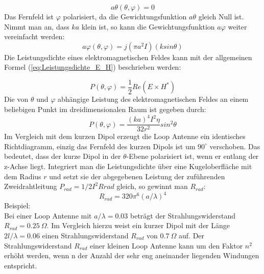 \begin{equation}\label{GewichtungsfunktionLoop_aTheta}
a\theta(\theta, \varphi) =0
\end{equation}
Das Fernfeld ist $\varphi$ polarisiert, da die Gewichtungsfunktion $a\theta$ gleich Null ist. Nimmt man an, dass $ka$ klein ist, so kann die Gewichtungsfunktion $a\varphi$ weiter vereinfacht werden:
\begin{equation}
a\varphi(\theta,\varphi)=j(\pi a^{2}I)(k sin \theta)
\end{equation}
Die Leistungsdichte eines elektromagnetischen Feldes kann mit der allgemeinen Formel (\ref{eq:Leistungsdichte_E_H}) beschrieben werden: 

\begin{equation}
P(\theta,\varphi)=\frac{1}{2}Re(E \times H^*)
\label{eq:Leistungsdichte_E_H}
\end{equation}
Die von $\theta$ und $\varphi$ abhängige Leistung des elektromagnetischen Feldes an einem beliebigen Punkt im dreidimensionalen Raum ist gegeben durch:
\begin{equation}
P(\theta,\varphi )=\frac{(ka)^{4}I^{2}\eta}{32r^{2}}sin^{2}\theta
\end{equation}
Im Vergleich mit dem kurzen Dipol erzeugt die Loop Antenne ein identisches Richtdiagramm, einzig das Fernfeld des kurzen Dipols ist um $90^\circ$ verschoben. Das bedeutet, dass der kurze Dipol in der $\theta$-Ebene polarisiert ist, wenn er entlang der z-Achse liegt. Integriert man die Leistungsdichte über eine Kugeloberfläche mit dem Radius $r$ und setzt sie der abgegebenen Leistung der zuführenden Zweidrahtleitung $P_{rad}=1/2 I^{2}Rrad $ gleich, so gewinnt man $R_{rad}$:
\begin{equation}
R_{rad} = 320\pi^{6} (a/\lambda)^{4}\label{eq:RradLoop}
\end{equation}
Beispiel:\\
Bei einer Loop Antenne mit $a/\lambda = 0.03$ beträgt der Strahlungswiderstand $R_{rad} = 0.25\ \Omega$. Im Vergleich hierzu weist ein kurzer Dipol mit der Länge $2l/\lambda= 0.06$ einen Strahlungswiderstand $R_{rad}$ von $0.7 \ \Omega$ auf.  Der Strahlungswiderstand $R_{rad}$ einer kleinen Loop Antenne kann um den Faktor $n^{2}$ erhöht werden, wenn n der Anzahl der sehr eng aneinander liegenden Windungen entspricht. 



